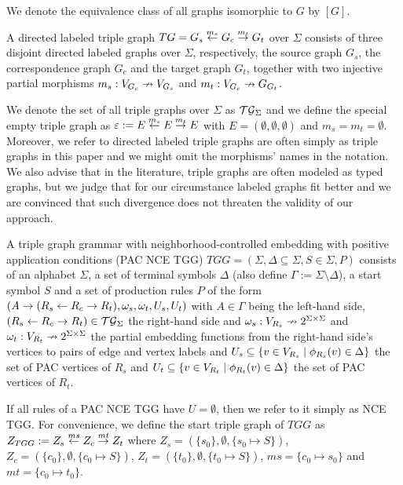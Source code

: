 \documentclass[a4paper,twoside]{article}
\begin{document}
We denote the equivalence class of all graphs isomorphic to $G$ by $[G]$.

\begin{definition}
	A directed labeled triple graph $TG = G_s \overset{m_s}{\leftarrow} G_c \overset{m_t}{\rightarrow} G_t$ over $\Sigma$ consists of three disjoint directed labeled graphs over $\Sigma$, respectively, the source graph $G_s$, the correspondence graph $G_c$ and the target graph $G_t$, together with two injective partial morphisms $m_s: V_{G_c} \nrightarrow V_{G_s}$ and $m_t : V_{G_c} \nrightarrow G_{G_t}$.
\end{definition}

We denote the set of all triple graphs over $\Sigma$ as $\mathcal{TG}_{\Sigma}$ and we define the special empty triple graph as $\varepsilon := E \overset{m_s}{\leftarrow} E \overset{m_t}{\rightarrow} E$ with $E = (\emptyset, \emptyset, \emptyset)$ and $m_s = m_t = \emptyset$. Moreover, we refer to directed labeled triple graphs are often simply as triple graphs in this paper and we might omit the morphisms' names in the notation. We also advise that in the literature, triple graphs are often modeled as typed graphs, but we judge that for our circumstance labeled graphs fit better and we are convinced that such divergence does not threaten the validity of our approach.

\begin{definition}
	A triple graph grammar with neighborhood-controlled embedding with positive application conditions (PAC NCE TGG) $TGG = (\Sigma, \Delta \subseteq \Sigma, S \in \Sigma, P)$ consists of an alphabet $\Sigma$, a set of terminal symbols $\Delta$ (also define $\Gamma := \Sigma \setminus \Delta$), a start symbol $S$ and a set of production rules $P$ of the form $(A \to (R_s \overset{}{\leftarrow} R_c \overset{}{\rightarrow} R_t), \omega_s, \omega_t, U_s, U_t)$ with $A \in \Gamma$ being the left-hand side, $(R_s \overset{}{\leftarrow} R_c \overset{}{\rightarrow} R_t) \in \mathcal{TG}_{\Sigma}$ the right-hand side and $\omega_s : V_{R_s} \nrightarrow 2^{\Sigma \times \Sigma}$ and $\omega_t : V_{R_t} \nrightarrow 2^{\Sigma \times \Sigma}$ the partial embedding functions from the right-hand side's vertices to pairs of edge and vertex labels and $U_s \subseteq \{v \in V_{R_s} \; | \; \phi_{R_s}(v) \in \Delta\}$ the set of PAC vertices of $R_s$ and $U_t \subseteq \{v \in V_{R_t} \; | \; \phi_{R_t}(v) \in \Delta\}$ the set of PAC vertices of $R_t$.
\end{definition}

If all rules of a PAC NCE TGG have $U = \emptyset$, then we refer to it simply as NCE TGG. For convenience, we define the start triple graph of $TGG$ as $Z_{TGG} := Z_s \overset{ms}{\leftarrow} Z_c \overset{mt}{\rightarrow} Z_t$ where $Z_s = (\{s_0\},\emptyset,\{s_0 \mapsto S\})$, $Z_c = (\{c_0\},\emptyset,\{c_0 \mapsto S\})$, $Z_t = (\{t_0\},\emptyset,\{t_0 \mapsto S\})$, $ms = \{c_0 \mapsto s_0 \}$ and $mt = \{c_0 \mapsto t_0 \}$.
\end{document}
